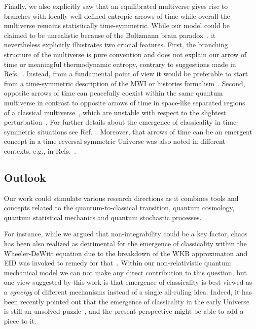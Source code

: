 \documentclass[pre,onecolumn,12pt,aps,longbibliography,nofootinbib]{revtex4-2}
\newcommand{\blue}[1]{#1}
\begin{document}
\blue{Finally, we also explicitly saw that an equilibrated multiverse gives rise to branches with locally well-defined entropic arrows of time while overall the multiverse remains statistically time-symmetric. While our model could be claimed to be unrealistic because of the Boltzmann brain paradox~\cite{AlbrechtSorboPRD2004, CarrollInBook2020, MuellerQuantum2020}, it nevertheless explicitly illustrates two crucial features. First, the branching structure of the multiverse is pure convention and does not explain our arrow of time or meaningful thermodynamic entropy, contrary to suggestions made in Refs.~\cite{DeutschInBook2010, Aaronson2013}. Instead, from a fundamental point of view it would be preferable to start from a time-symmetric description of the MWI or histories formalism~\cite{AharonovBergmannLebowitzPR1964, IshamJMP1994, IshamLindenPRA1997, GriffithsBook2002, VaidmanInBook2010}. Second, opposite arrows of time can peacefully coexist within the same quantum multiverse in contrast to opposite arrows of time in space-like separated regions of a classical multiverse~\cite{SchulmanPRL1999}, which are unstable with respect to the slightest perturbation~\cite{KupervasserNikolicZlaticFP2012}. For further details about the emergence of classicality in time-symmetric situations see Ref.~\cite{AlbrechtBaunachArrasmithPRD2022}. Moreover, that arrows of time can be an emergent concept in a time reversal symmetric Universe was also noted in different contexts, e.g., in Refs.~\cite{SchulmanPRL1999, CarrollChenArXiv2004, BarbourKoslowskiMercatiPRL2014, DeutschAguirreFP2022}.}

\subsection{\blue{Outlook}}

\blue{Our work could stimulate various research directions as it combines tools and concepts related to the quantum-to-classical transition, quantum cosmology, quantum statistical mechanics and quantum stochastic processes.}

\blue{For instance, while we argued that non-integrability could be a key factor,} chaos has been also realized as detrimental for the emergence of classicality within the Wheeler-DeWitt equation due to the breakdown of the WKB approximaton and EID was invoked to remedy for that~\cite{CalzettaGonzalezPRD1995, CornishShellardPRL1998, CalzettaCQG2012}. Within our non-relativistic quantum mechanical model we can not make any direct contribution to this question, but one view suggested by this work is that emergence of classicality is best viewed as a \emph{synergy} of different mechanisms instead of a single all-ruling idea. Indeed, it has been recently pointed out that the emergence of classicality in the early Universe is still an unsolved puzzle~\cite{BerjonOkonSudarskyPRD2021}, and the present perspective might be able to add a piece to it.
\end{document}
